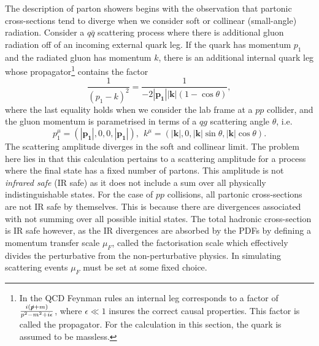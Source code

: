 The description of parton showers begins with the observation that partonic cross-sections tend to diverge when we consider soft or collinear (small-angle) radiation. Consider a $q\bar{q}$ scattering process where there is additional gluon radiation off of an incoming external quark leg. If the quark has momentum $p_1$ and the radiated gluon has momentum $k$, there is an additional internal quark leg whose propagator\footnote{In the QCD Feynman rules an internal leg corresponds to a factor of $\frac{i(\slashed{p}+m)}{p^2-m^2+i\epsilon}$, where $\epsilon\ll1$ insures the correct causal properties. This factor is called the propagator. For the calculation in this section, the quark is assumed to be massless.} contains the factor 
\begin{equation}\label{eq:medivergence}
    \frac{1}{(p_1-k)^2}=\frac{1}{-2|\mathbf{p_1}||\mathbf{k}|(1-\cos{\theta})},
\end{equation}
where the last equality holds when we consider the lab frame at a $pp$ collider, and the gluon momentum is parametrised in terms of a $qg$ scattering angle $\theta$, i.e.
\begin{equation}
    p_1^{\mu}=(|\mathbf{p_1}|,0,0,|\mathbf{p_1}|),\hspace{5pt}k^\mu=(|\mathbf{k}|,0,|\mathbf{k}|\sin{\theta},|\mathbf{k}|\cos{\theta}).
\end{equation}
The scattering amplitude diverges in the soft and collinear limit. The problem here lies in that this calculation pertains to a scattering amplitude for a process where the final state has a fixed number of partons. This amplitude is not \textit{infrared safe} (IR safe) as it does not include a sum over all physically indistinguishable states. For the case of $pp$ collisions, all partonic cross-sections are not IR safe by themselves. This is because there are divergences associated with not summing over all possible initial states. The total hadronic cross-section is IR safe however, as the IR divergences are absorbed by the PDFs by defining a momentum transfer scale $\mu_F$, called the factorisation scale which effectively divides the perturbative from the non-perturbative physics. In simulating scattering events $\mu_F$ must be set at some fixed choice. %

